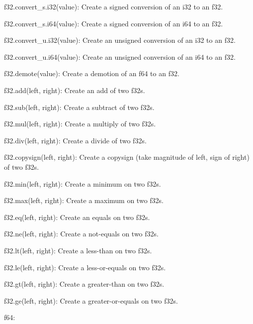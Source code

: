 \begin{DoxyItemize}
\begin{DoxyItemize}
\item {\ttfamily f32.\+convert\+\_\+s.\+i32(value)}\+: Create a signed conversion of an {\ttfamily i32} to an {\ttfamily f32}.
\item {\ttfamily f32.\+convert\+\_\+s.\+i64(value)}\+: Create a signed conversion of an {\ttfamily i64} to an {\ttfamily f32}.
\item {\ttfamily f32.\+convert\+\_\+u.\+i32(value)}\+: Create an unsigned conversion of an {\ttfamily i32} to an {\ttfamily f32}.
\item {\ttfamily f32.\+convert\+\_\+u.\+i64(value)}\+: Create an unsigned conversion of an {\ttfamily i64} to an {\ttfamily f32}.
\item {\ttfamily f32.\+demote(value)}\+: Create a demotion of an {\ttfamily f64} to an {\ttfamily f32}.
\item {\ttfamily f32.\+add(left, right)}\+: Create an add of two {\ttfamily f32}s.
\item {\ttfamily f32.\+sub(left, right)}\+: Create a subtract of two {\ttfamily f32}s.
\item {\ttfamily f32.\+mul(left, right)}\+: Create a multiply of two {\ttfamily f32}s.
\item {\ttfamily f32.\+div(left, right)}\+: Create a divide of two {\ttfamily f32}s.
\item {\ttfamily f32.\+copysign(left, right)}\+: Create a copysign (take magnitude of left, sign of right) of two {\ttfamily f32}s.
\item {\ttfamily f32.\+min(left, right)}\+: Create a minimum on two {\ttfamily f32}s.
\item {\ttfamily f32.\+max(left, right)}\+: Create a maximum on two {\ttfamily f32}s.
\item {\ttfamily f32.\+eq(left, right)}\+: Create an equals on two {\ttfamily f32}s.
\item {\ttfamily f32.\+ne(left, right)}\+: Create a not-\/equals on two {\ttfamily f32}s.
\item {\ttfamily f32.\+lt(left, right)}\+: Create a less-\/than on two {\ttfamily f32}s.
\item {\ttfamily f32.\+le(left, right)}\+: Create a less-\/or-\/equals on two {\ttfamily f32}s.
\item {\ttfamily f32.\+gt(left, right)}\+: Create a greater-\/than on two {\ttfamily f32}s.
\item {\ttfamily f32.\+ge(left, right)}\+: Create a greater-\/or-\/equals on two {\ttfamily f32}s.
\end{DoxyItemize}
\item {\ttfamily f64}\+:

\end{DoxyItemize}
